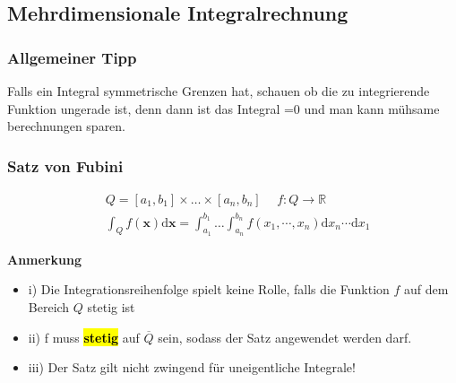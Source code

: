 \documentclass[8pt, a4paper, landscape, fleqn]{scrartcl}
\newenvironment {annotation}[1]
				{\begin{itshape} \begin{small} \textbf{#1} \begin{itemize}}
				{\end{itemize} \end{small} \end{itshape}}
\def\d{\text{d}}
\begin{document}
\begin{multicols*}{3}
				    
				    
				
			\subsection{Mehrdimensionale Integralrechnung}
			    \subsubsection{Allgemeiner Tipp}
			    Falls ein Integral symmetrische Grenzen hat,  schauen  ob die zu integrierende Funktion ungerade ist, denn dann ist das Integral =0 und man kann mühsame berechnungen sparen.
				\subsubsection{Satz von Fubini}
					\vspace{-7pt}
					\begin{align*}
						&Q=[a_1, b_1]\times \dots \times [a_n, b_n] \hspace{15pt} f: Q \rightarrow \mathbb{R}\\
						&\int_{Q}f(\textbf{x})\text{d}\textbf{x}=\int_{a_1}^{b_1}\dots \int_{a_n}^{b_n}f(x_1, \cdots, x_n)\d x_n \cdots \d x_1
					\end{align*}
					\begin{annotation}{Anmerkung}
						\item [i)] Die Integrationsreihenfolge spielt keine Rolle, falls die Funktion $f$ auf dem Bereich $Q$ stetig ist
						\item[ii)] f muss \hl{\textbf{stetig}} auf $\overline{Q}$ sein, sodass der Satz angewendet werden darf.
						\item[iii)] Der Satz gilt nicht zwingend für uneigentliche Integrale!
					\end{annotation}

\end{multicols*}
\end{document}
